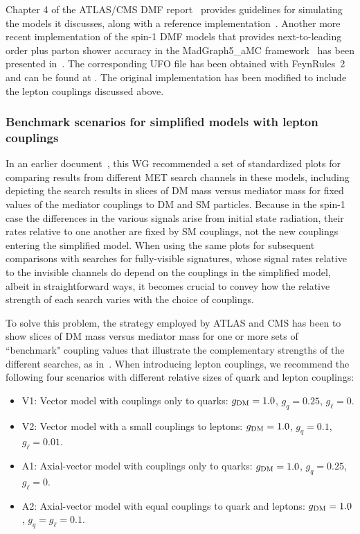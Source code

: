 \documentclass[a4paper, 11pt,notoc]{article}
\newcommand{\gDM}{\ensuremath{g_{\rm{DM}}}\xspace}
\newcommand{\gq}{\ensuremath{g_q}\xspace}
\newcommand{\gdm}{\gDM}
\begin{document}
Chapter 4 of the ATLAS/CMS DMF report~\cite{Abercrombie:2015wmb} provides guidelines for simulating the models it discusses, along with a reference implementation~\cite{LHCDMFmodels}. Another more recent implementation of the spin-1 DMF models that provides next-to-leading order plus parton shower accuracy in the {\sc MadGraph5\_aMC\@NLO} framework~\cite{Alwall:2014hca} has been presented in~\cite{Backovic:2015soa}. The corresponding {\sc UFO} file \cite{Degrande:2011ua} has been obtained with {\sc FeynRules~2}~\cite{Alloul:2013bka} and can be found at \cite{DMsimp}. The original implementation has been modified to include the lepton couplings discussed above. 

\subsubsection{Benchmark scenarios for simplified models with lepton couplings}

In an earlier document~\cite{Boveia:2016mrp}, this WG recommended a set of standardized plots for comparing results from different MET search channels in these models, including depicting the search results in slices of DM mass versus mediator mass for fixed values of the mediator couplings to DM and SM particles. Because in the spin-1 case the differences in the various signals arise from initial state radiation, their rates relative to one another are fixed by SM couplings, not the new couplings entering  the simplified model. When using the same plots for subsequent comparisons with searches for fully-visible signatures, whose signal rates relative to the invisible channels do depend on the couplings in the simplified model, albeit in straightforward ways, it becomes crucial to convey how the relative strength of each search varies with the choice of couplings.

To solve this problem, the strategy employed by ATLAS and CMS has been to show slices of DM mass versus mediator mass for one or more sets of ``benchmark" coupling values that illustrate the complementary strengths of the different searches, as in~\cite{Boveia:2016mrp,ATLASsummaryplots,CMS_SummaryPlots_ICHEP}. When introducing lepton couplings, we recommend the following four scenarios with different relative sizes of quark and lepton couplings:
\begin{itemize}
    \item V1: Vector model with couplings only to quarks: $\gdm=1.0$, $\gq = 0.25$, $g_\ell = 0$.
    \item V2: Vector model with a small couplings to leptons: $\gdm=1.0$, $\gq = 0.1$, $g_\ell = 0.01$.
    \item A1: Axial-vector model with couplings only to quarks: $\gdm=1.0$, $\gq = 0.25$, $g_\ell = 0$.
    \item A2: Axial-vector model with equal couplings to quark and leptons: $\gdm=1.0$, $g_q=g_\ell=0.1$.
\end{itemize}
\end{document}
